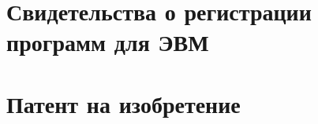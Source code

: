 \chapter{Свидетельства о регистрации программ для ЭВМ} 











\chapter{Патент на изобретение} 

 



